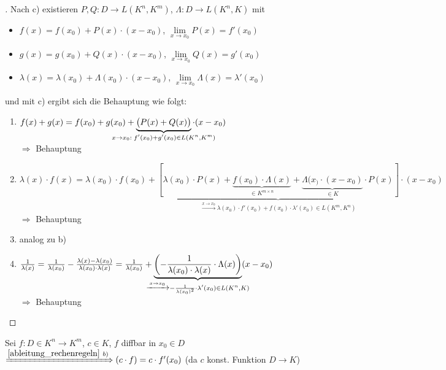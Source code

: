 \begin{proof}[]
	Nach  c) existieren $P,Q: D\to L(K^n, K^m)$, $\Lambda:D\to L(K^n, K)$ mit
\begin{itemize}[topsep=\dimexpr -\baselineskip / 3\relax]
	\item $f(x) = f(x_0) + P(x) \cdot (x - x_0)$, $\lim\limits_{x\to x_0} P(x) = f'(x_0)$
	\item $g(x) = g(x_0) + Q(x) \cdot (x - x_0)$, $\lim\limits_{x\to x_0} Q(x) = g'(x_0)$
	\item $\lambda(x) = \lambda(x_0) + \Lambda(x_0) \cdot (x - x_0)$, $\lim\limits_{x\to x_0} \Lambda(x) = \lambda'(x_0)$
\end{itemize}
und mit  c) ergibt sich die Behauptung wie folgt:
\begin{enumerate}[label={\alph*)}]
	\item $f(x) + g(x) = f(x_0) + g(x_0) + \underbrace{\big( P(x) + Q(x) \big)}_{\mathclap{x\to x_0:\; f'(x_0) + g'(x_0)\in L(K^n, K^m)}}\cdot (x - x_0)$ \\
	$\Rightarrow$ Behauptung
	\item $\lambda(x)\cdot f(x) = \lambda(x_0) \cdot f(x_0) + \underbrace{\left[ \lambda(x_0) \cdot P(x) + \underbrace{f(x_0)\cdot \Lambda(x)}_{\in K^{m\times n}} + \underbrace{\Lambda(x_) \cdot (x - x_0)}_{\in K} \cdot P(x) \right]}_{\xrightarrow{x\to x_0}\lambda(x_0)\cdot f'(x_0) + f(x_0)\cdot \lambda'(x_0)\in L(K^m, K^n)} \cdot (x - x_0)$ \\
	$\Rightarrow$ Behauptung
	\item analog zu b)
	\item $\frac{1}{\lambda(x)} = \frac{1}{\lambda(x_0)} - \frac{\lambda(x) - \lambda(x_0)}{\lambda(x_0)\cdot \lambda(x)} = \frac{1}{\lambda(x_0)} + \underbrace{\left( - \frac{1}{\lambda(x_0)\cdot\lambda(x)}\cdot \Lambda(x)\right)}_{\mathclap{\xrightarrow{x\to x_0}-\frac{1}{\lambda(x_0)^2}\cdot \lambda'(x_0)\in L(K^n, K)}} (x - x_0)$\\
	$\Rightarrow$ Behauptung
\end{enumerate}
\end{proof}

\begin{example}
	Sei $f:D\in K^n\to K^m$, $c\in K$, $f$  \gls{diffbar} in $x_0\in D$\\
	$\xRightarrow{\ref{ableitung_rechenregeln}\ b)} (c\cdot f) = c\cdot f'(x_0)$ (da $c$ konst. Funktion $D\to K$)
\end{example}

